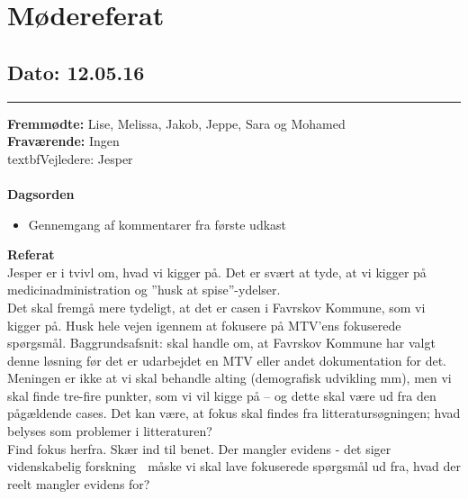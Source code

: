 \chapter{Mødereferat}

\section{Dato: 12.05.16}
\hrule

\textbf{Fremmødte:} Lise, Melissa, Jakob, Jeppe, Sara og Mohamed \\
\textbf{Fraværende:} Ingen
\\textbf{Vejledere:} Jesper
\\
\\
\textbf{Dagsorden}
\begin{itemize}
	\item Gennemgang af kommentarer fra første udkast \\ 
\end{itemize}


\textbf{Referat} 
\\
Jesper er i tvivl om, hvad vi kigger på. Det er svært at tyde, at vi kigger på medicinadministration og ”husk at spise”-ydelser. \\
Det skal fremgå mere tydeligt, at det er casen i Favrskov Kommune, som vi kigger på. Husk hele vejen igennem at fokusere på MTV’ens fokuserede spørgsmål. 
Baggrundsafsnit: skal handle om, at Favrskov Kommune har valgt denne løsning før det er udarbejdet en MTV eller andet dokumentation for det. Meningen er ikke at vi skal behandle alting (demografisk udvikling mm), men vi skal finde tre-fire punkter, som vi vil kigge på – og dette skal være ud fra den pågældende cases. Det kan være, at fokus skal findes fra litteratursøgningen; hvad belyses som problemer i litteraturen? \\ Find fokus herfra. 
Skær ind til benet. 
Der mangler evidens - det siger videnskabelig forskning  måske vi skal lave fokuserede spørgsmål ud fra, hvad der reelt mangler evidens for? \\


